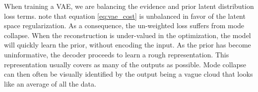When training a VAE, we are balancing the evidence and prior latent distribution loss terms. \citet{Kingma2013} note that equation \ref{eq:vae_cost} is unbalanced in favor of the latent space regularization. As a consequence, the un-weighted loss suffers from mode collapse. When the reconstruction is under-valued in the optimization, the model will quickly learn the prior, without encoding the input. As the prior has become uninformative, the decoder proceeds to learn a rough representation. This representation usually covers as many of the outputs as possible. Mode collapse can then often be visually identified by the output being a vague cloud that looks like an average of all the data. 
